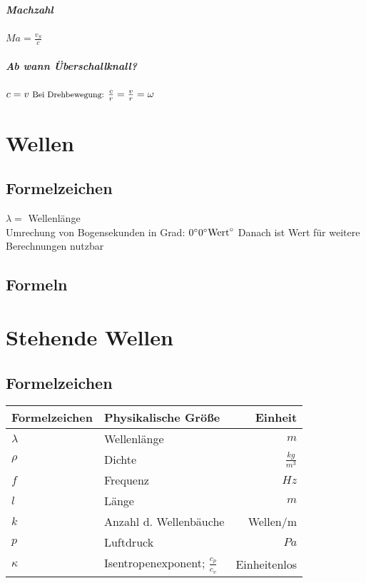 \documentclass[a4paper, 12pt]{scrreprt}
\begin{document}
\paragraph{Machzahl} \dotfill \(Ma = \frac{v_S}{c}\)
\paragraph{Ab wann Überschallknall?} \dotfill \(c = v \text{ \footnotesize Bei Drehbewegung: }\frac{c}{r} = \frac{v}{r} = \omega\)





\chapter{Wellen}

\section{Formelzeichen}
\(\lambda=\) \dotfill Wellenlänge\\
Umrechung von Bogensekunden in Grad: \dotfill \(0 \degree 0\degree \text{Wert}\degree\) Danach ist Wert für weitere Berechnungen nutzbar

\section{Formeln}

\chapter{Stehende Wellen}

\section{Formelzeichen}

\begin{center}
  \makegapedcells{}
  \begin{tabular}{l | l | r}
    Formelzeichen & Physikalische Größe & Einheit\\\hline \hline
    \(\lambda\) & Wellenlänge & \(m\)\\ \hline
    \(\rho\) & Dichte & \(\frac{kg}{m^3}\)\\ \hline
    \(f\) & Frequenz & \(Hz\)\\ \hline
    \(l\) & Länge & \(m\)\\ \hline
    \(k\) & Anzahl d. Wellenbäuche & Wellen/m\\ \hline
    \(p\) & Luftdruck & \(Pa\)\\ \hline
    \(\kappa\) & Isentropenexponent; \(\frac{c_p}{c_v}\) & Einheitenlos\\ \hline
  \end{tabular}
\end{center}
\end{document}
